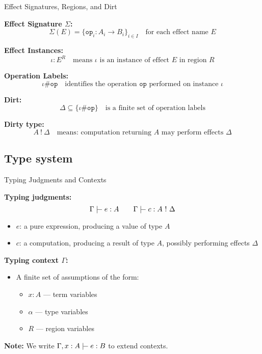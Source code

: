 \begin{frame}{Effect Signatures, Regions, and Dirt}

\textbf{Effect Signature \( \Sigma \):}
\[
\Sigma(E) = \{ \texttt{op}_i : A_i \rightarrow B_i \}_{i \in I}
\quad \text{for each effect name } E
\]

\vspace{0.5em}
\textbf{Effect Instances:}
\[
\iota : E^R
\quad \text{means } \iota \text{ is an instance of effect } E \text{ in region } R
\]

\vspace{1em}
\textbf{Operation Labels:}
\[
\iota \# \texttt{op}
\quad \text{identifies the operation } \texttt{op} \text{ performed on instance } \iota
\]

\vspace{1em}
\textbf{Dirt:}
\[
\Delta \subseteq \{ \iota \# \texttt{op} \}
\quad \text{is a finite set of operation labels}
\]

\vspace{1em}
\textbf{Dirty type:}
\[
A\ !\ \Delta \quad \text{means: computation returning } A \text{ may perform effects } \Delta
\]

\end{frame}
\subsection{Type system}
\begin{frame}{Typing Judgments and Contexts}

\textbf{Typing judgments:}
$$
\Gamma \tvdash e : A
\qquad
\Gamma \tvdash c : A\ !\ \Delta
$$

\begin{itemize}
  \item \( e \): a pure expression, producing a value of type \( A \)
  \item \( c \): a computation, producing a result of type \( A \), possibly performing effects \( \Delta \)
\end{itemize}

\vspace{1em}
\textbf{Typing context \( \Gamma \):}
\begin{itemize}
  \item A finite set of assumptions of the form:
    \begin{itemize}
      \item \( x : A \) — term variables
      \item \( \alpha \) — type variables
      \item \( R \) — region variables
    \end{itemize}
\end{itemize}

\vspace{1em}
\textbf{Note:} We write \( \Gamma, x : A \tvdash e : B \) to extend contexts.
\end{frame}

